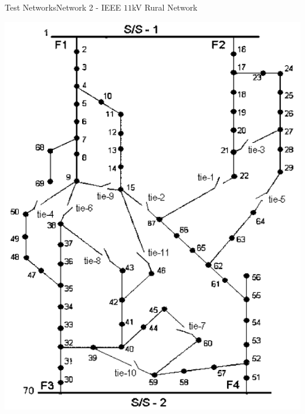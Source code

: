\documentclass[xcolor=svgnames,aspectratio=32,8pt]{beamer}
\begin{document}
\begin{frame}
{Test Networks}{Network 2 - IEEE $11$kV Rural Network}
\begin{changemargin}{-1cm}{-1cm} 

\begin{minipage}[!h]{.5\paperwidth}
\centering
\vspace{0.4cm}
\includegraphics[width=0.35\paperwidth]{NwImages/Rural_Network.png}
\end{minipage}%

\end{changemargin}
\end{frame}
\end{document}

